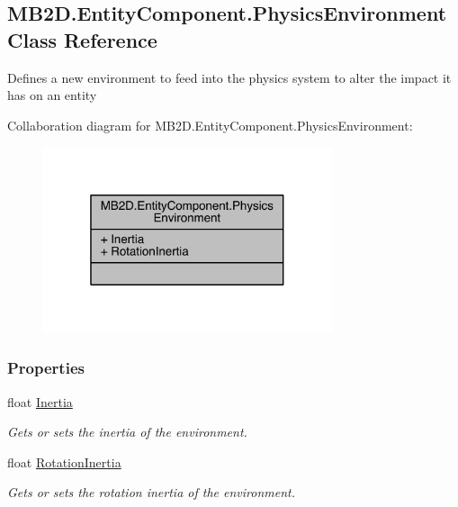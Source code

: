 \hypertarget{class_m_b2_d_1_1_entity_component_1_1_physics_environment}{}\subsection{M\+B2\+D.\+Entity\+Component.\+Physics\+Environment Class Reference}
\label{class_m_b2_d_1_1_entity_component_1_1_physics_environment}


Defines a new environment to feed into the physics system to alter the impact it has on an entity  




Collaboration diagram for M\+B2\+D.\+Entity\+Component.\+Physics\+Environment\+:
\nopagebreak
\begin{figure}[H]
\begin{center}
\leavevmode
\includegraphics[width=241pt]{class_m_b2_d_1_1_entity_component_1_1_physics_environment__coll__graph}
\end{center}
\end{figure}
\subsubsection*{Properties}
\begin{DoxyCompactItemize}
\item 
float \hyperlink{class_m_b2_d_1_1_entity_component_1_1_physics_environment_a67ab743dbbe138e3eac38871e51c21d6}{Inertia}
\begin{DoxyCompactList}\small\item\em Gets or sets the inertia of the environment. \end{DoxyCompactList}\item 
float \hyperlink{class_m_b2_d_1_1_entity_component_1_1_physics_environment_a1c2fdbef41b7dee04b59200dd5d90cdc}{Rotation\+Inertia}
\begin{DoxyCompactList}\small\item\em Gets or sets the rotation inertia of the environment. \end{DoxyCompactList}\end{DoxyCompactItemize}


